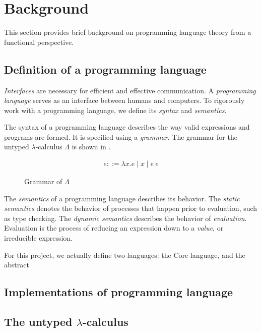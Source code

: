\section{Background}
\label{sec:background}

This section provides brief background on programming language theory from a functional perspective.

\subsection{Definition of a programming language}
\label{sec:pl-definition}

\textit{Interfaces} are necessary for efficient and effective communication. A \textit{programming language} serves as an interface between humans and computers. To rigorously work with a programming language, we define its \textit{syntax} and \textit{semantics}.

The syntax of a programming language describes the way valid expressions and programs are formed. It is specified using a \textit{grammar}. The grammar for the untyped $\lambda$-calculus $\Lambda$ is shown in .

\begin{figure}
  \centering
  \begin{align*}
    e ::= \lambda x.e \mid x \mid e\ e
  \end{align*}
  \caption{Grammar of $\Lambda$}
  \label{fig:ulc-grammar}
\end{figure}

The \textit{semantics} of a programming language describes its behavior. The \textit{static semantics} denotes the behavior of processes that happen prior to evaluation, such as type checking. The \textit{dynamic semantics} describes the behavior of \textit{evaluation}. Evaluation is the process of reducing an expression down to a \textit{value}, or irreducible expression.

For this project, we actually define two languages: the Core language, and the abstract 

\subsection{Implementations of programming language}
\label{sec:pl-implementation}


\subsection{The untyped $\lambda$-calculus}
\label{sec:ulc}


